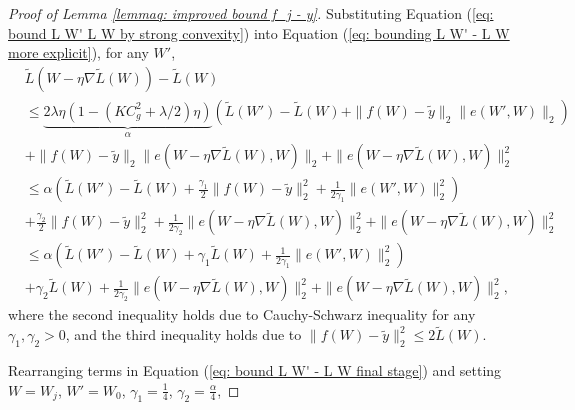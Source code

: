 \documentclass{article} \usepackage{iclr2023/iclr2023_conference,times}
\begin{document}
\begin{proof}[Proof of Lemma \ref{lemmaq: improved bound f_j - y}]
Substituting Equation (\ref{eq: bound L W' L W by strong convexity}) into Equation (\ref{eq: bounding L W' - L W more explicit}), for any $W'$,
\begin{align}
    &\tilde{L}( W - \eta \nabla \tilde{L}(W)) - \tilde{L}(W) \nonumber\\
    &\leq \underbrace{2 \lambda \eta (1 - (K C_g^2 + \lambda/2) \eta)}_{\alpha} \left( \tilde{L}(W') - \tilde{L}(W) + \| f(W) - \tilde{y} \|_2 \| e(W',W)\|_2 \right) \nonumber\\
    &+ \| f(W) - \tilde{y} \|_2 \| e( W - \eta \nabla \tilde{L}(W),W) \|_2 + \|e( W - \eta \nabla \tilde{L}(W),W) \|_2^2 \nonumber\\
    &\leq \alpha \left( \tilde{L}(W') - \tilde{L}(W) + \frac{\gamma_1}{2} \| f(W) - \tilde{y} \|_2^2 + \frac{1}{ 2 \gamma_1} \| e(W',W) \|_2^2\right) \nonumber\\
    &+  \frac{\gamma_2}{2} \| f(W) - \tilde{y} \|_2^2 + \frac{1}{ 2 \gamma_2} \| e(W - \eta \nabla \tilde{L}(W),W) \|_2^2 + \|e(W - \eta \nabla \tilde{L}(W),W) \|_2^2 \nonumber\\
    &\leq \alpha \left( \tilde{L}(W') - \tilde{L}(W) + \gamma_1 \tilde{L}(W)  + \frac{1}{ 2 \gamma_1} \| e(W',W) \|_2^2\right) \nonumber\\
    &+  \gamma_2 \tilde{L}(W)  + \frac{1}{ 2 \gamma_2} \| e(W - \eta \nabla \tilde{L}(W),W) \|_2^2 + \|e(W - \eta \nabla \tilde{L}(W),W) \|_2^2,
    \label{eq: bound L W' - L W final stage}
\end{align}
where the second inequality holds due to Cauchy-Schwarz inequality for any $\gamma_1, \gamma_2 > 0$, and the third inequality holds due to  $\| f(W) - \tilde{y} \|_2^2 \leq 2 \tilde{L}(W)$. 

Rearranging terms in Equation (\ref{eq: bound L W' - L W final stage}) and setting $W = W_j$, $W' = W_0$, $\gamma_1 = \frac{1}{4}$, $\gamma_2 = \frac{\alpha}{4}$, 


\end{proof}
\end{document}

